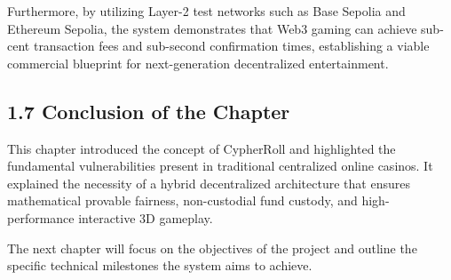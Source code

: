 Furthermore, by utilizing Layer-2 test networks such as Base Sepolia and Ethereum Sepolia, the system demonstrates that Web3 gaming can achieve sub-cent transaction fees and sub-second confirmation times, establishing a viable commercial blueprint for next-generation decentralized entertainment.

\subsection*{1.7 Conclusion of the Chapter}
This chapter introduced the concept of CypherRoll and highlighted the fundamental vulnerabilities present in traditional centralized online casinos. It explained the necessity of a hybrid decentralized architecture that ensures mathematical provable fairness, non-custodial fund custody, and high-performance interactive 3D gameplay.

The next chapter will focus on the objectives of the project and outline the specific technical milestones the system aims to achieve.
\label{chap:intro_end}
